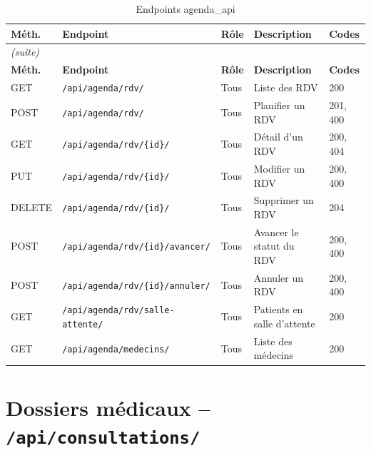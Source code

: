 \documentclass[12pt,a4paper]{report}
\begin{document}
\begin{longtable}{|p{1.5cm}|p{5cm}|p{2.5cm}|p{3cm}|p{1.5cm}|}
  \caption{Endpoints agenda\_api} \\
  \hline
  \rowcolor{medaccent}
  \textbf{Méth.} & \textbf{Endpoint} & \textbf{Rôle} & \textbf{Description} & \textbf{Codes} \\
  \hline
  \endfirsthead
  \multicolumn{5}{l}{\small\textit{(suite)}} \\
  \hline
  \rowcolor{medaccent}
  \textbf{Méth.} & \textbf{Endpoint} & \textbf{Rôle} & \textbf{Description} & \textbf{Codes} \\
  \hline
  \endhead
  \hline
  \endfoot
  GET & \texttt{/api/agenda/rdv/} & Tous & Liste des RDV & 200 \\
  \hline
  POST & \texttt{/api/agenda/rdv/} & Tous & Planifier un RDV & 201, 400 \\
  \hline
  GET & \texttt{/api/agenda/rdv/\{id\}/} & Tous & Détail d'un RDV & 200, 404 \\
  \hline
  PUT & \texttt{/api/agenda/rdv/\{id\}/} & Tous & Modifier un RDV & 200, 400 \\
  \hline
  DELETE & \texttt{/api/agenda/rdv/\{id\}/} & Tous & Supprimer un RDV & 204 \\
  \hline
  POST & \texttt{/api/agenda/rdv/\{id\}/avancer/} & Tous & Avancer le statut du RDV & 200, 400 \\
  \hline
  POST & \texttt{/api/agenda/rdv/\{id\}/annuler/} & Tous & Annuler un RDV & 200, 400 \\
  \hline
  GET & \texttt{/api/agenda/rdv/salle-attente/} & Tous & Patients en salle d'attente & 200 \\
  \hline
  GET & \texttt{/api/agenda/medecins/} & Tous & Liste des médecins & 200 \\
  \hline
\end{longtable}

\section{Dossiers médicaux -- \texttt{/api/consultations/}}
\end{document}
